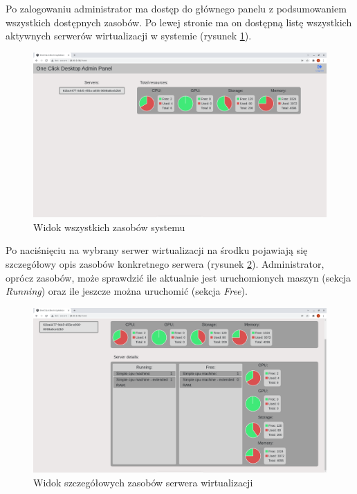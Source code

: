 \documentclass[../opis-rozwiazania.tex]{subfiles}
\begin{document}
Po zalogowaniu administrator ma dostęp do głównego panelu z podsumowaniem wszystkich dostępnych zasobów.
Po lewej stronie ma on dostępną listę wszystkich aktywnych serwerów wirtualizacji w systemie (rysunek \ref{figure:system_interaction.admin.panel}).

\begin{figure}[ht!]
  \centering
  \includegraphics[width=\textwidth]{resources/admin_panel_home.png}
  \caption{Widok wszystkich zasobów systemu}
  \label{figure:system_interaction.admin.panel}
\end{figure}

Po naciśnięciu na wybrany serwer wirtualizacji na środku pojawiają się szczegółowy opis zasobów konkretnego serwera (rysunek \ref{figure:system_interaction.admin.details}).
Administrator, oprócz zasobów, może sprawdzić ile aktualnie jest uruchomionych maszyn (sekcja \textit{Running}) oraz ile jeszcze można uruchomić (sekcja \textit{Free}).

\begin{figure}[ht!]
  \centering
  \includegraphics[width=\textwidth]{resources/admin_panel_details.png}
  \caption{Widok szczegółowych zasobów serwera wirtualizacji}
  \label{figure:system_interaction.admin.details}
\end{figure}
\end{document}
